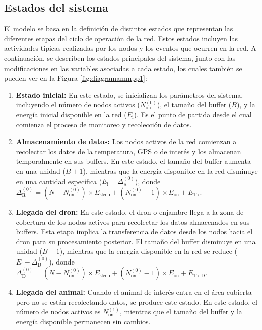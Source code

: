 \subsection{Estados del sistema}
El modelo se basa en la definición de distintos estados que representan las diferentes etapas del ciclo de operación de la red. Estos estados incluyen las actividades típicas realizadas por los nodos y los eventos que ocurren en la red. A continuación, se describen los estados principales del sistema, junto con las modificaciones en las variables asociadas a cada estado, los cuales también se pueden ver en la Figura \ref{fig:diagramammpp1}:

\begin{enumerate}[label=\arabic*.]
    \item \textbf{Estado inicial:} En este estado, se inicializan los parámetros del sistema, incluyendo el número de nodos activos  ($N_{\text{on}}^{(0)}$), el tamaño del buffer ($B$), y la energía inicial disponible en la red ($E_{\text{i}}$). Es el punto de partida desde el cual comienza el proceso de monitoreo y recolección de datos.
    
    \item \textbf{Almacenamiento de datos:} Los nodos activos de la red comienzan a recolectar los datos de la temperatura, GPS o de interés y los almacenan temporalmente en sus buffers. En este estado, el tamaño del buffer aumenta en una unidad ($B+1$), mientras que la energía disponible en la red disminuye en una cantidad específica ($E_{\text{i}} - \Delta_{\text{R}}^{(0)}$), donde $\Delta_{\text{R}}^{(0)} = (N - N_{\text{on}}^{(0)}) \times E_{\text{sleep}} + (N_{\text{on}}^{(0)} - 1) \times E_{\text{on}} + E_{\text{Tx}}$.
    
    \item \textbf{Llegada del dron:} En este estado, el dron o enjambre llega a la zona de cobertura de los nodos activos para recolectar los datos almacenados en sus buffers. Esta etapa implica la transferencia de datos desde los nodos hacia el dron para su procesamiento posterior. El tamaño del buffer disminuye en una unidad ($B-1$), mientras que la energía disponible en la red se reduce ($E_{\text{i}} - \Delta_{\text{D}}^{(0)}$), donde $\Delta_{\text{D}}^{(0)} = (N - N_{\text{on}}^{(0)}) \times E_{\text{sleep}} + (N_{\text{on}}^{(0)} - 1) \times E_{\text{on}} + E_{\text{Tx\_D}}$.
    
    \item \textbf{Llegada del animal:} Cuando el animal de interés entra en el área cubierta pero no se están recolectando datos, se produce este estado. En este estado, el número de nodos activos es $N_{\text{on}}^{(1)}$, mientras que el tamaño del buffer y la energía disponible permanecen sin cambios.
    

\end{enumerate}
